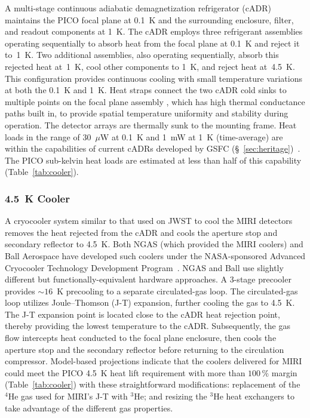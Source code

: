 A multi-stage continuous adiabatic demagnetization refrigerator (cADR) maintains the PICO focal plane at 0.1~K and the surrounding enclosure, filter, and readout components at 1~K. The cADR employs three refrigerant assemblies operating sequentially to absorb heat from the focal plane at 0.1~K and reject it to~1~K. Two additional assemblies, also operating sequentially, absorb this rejected heat at~1~K, cool other components to 1~K, and reject heat at~4.5~K. This configuration provides continuous cooling with small temperature variations at both the 0.1~K and 1~K. Heat straps connect the two cADR cold sinks to multiple points on the focal plane assembly , which has high thermal conductance paths built in, to provide spatial temperature uniformity and stability during operation. The detector arrays are thermally sunk to the mounting frame.  Heat loads in the range of 30~$\mu$W at 0.1~K and 1~mW at 1~K (time-average) are within the capabilities of current cADRs developed by GSFC (\S~\ref{sec:heritage})~\citep{Shirron2012,Shirron2016}. The PICO sub-kelvin heat loads are estimated at less than half of this capability (Table~\ref{tab:cooler}). 

\subsubsection{4.5~K Cooler}
\label{sec:4kcooler} %

A cryocooler system similar to that used on JWST to cool the MIRI detectors~\citep{Durand2008,Rabb2013} removes the heat rejected from the cADR and cools the aperture stop and secondary reflector to 4.5~K. Both NGAS (which provided the MIRI coolers) and Ball Aerospace have developed such coolers under the NASA-sponsored Advanced Cryocooler Technology Development Program~\citep{Glaister2006}. NGAS and Ball use slightly different but functionally-equivalent hardware approaches. 
A 3-stage precooler provides $\sim16$~K precooling to a separate circulated-gas loop. 
The circulated-gas loop utilizes Joule--Thomson (J-T) expansion, further cooling the gas to 4.5~K. 
The J-T expansion point is located close to the cADR heat rejection point, thereby providing the lowest temperature to the cADR. Subsequently, the gas flow intercepts heat conducted to the focal plane enclosure, then cools the aperture stop and the secondary reflector before returning to the circulation compressor.  Model-based projections indicate that the coolers delivered for MIRI could meet the PICO 4.5~K heat lift requirement with more than $100\,\%$ margin (Table~\ref{tab:cooler}) with these straightforward modifications: replacement of the $^4$He gas used for MIRI's J-T  with $^3$He; and resizing the $^3$He heat exchangers to take advantage of the different gas properties. 


